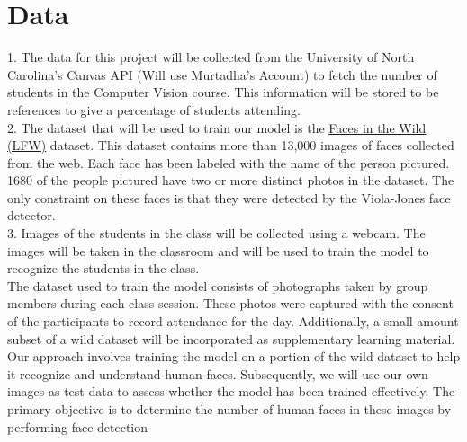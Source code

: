 \section{Data}
1. The data for this project will be collected from the University of North Carolina's Canvas API (Will use Murtadha's Account) to fetch the number of students in the Computer Vision course. This information will be stored to be references to give a percentage of students attending.\\
2. The dataset that will be used to train our model is the \href{http://vis-www.cs.umass.edu/lfw/}{\underline{Faces in the Wild (LFW)}} dataset. This dataset contains more than 13,000 images of faces collected from the web. Each face has been labeled with the name of the person pictured. 1680 of the people pictured have two or more distinct photos in the dataset. The only constraint on these faces is that they were detected by the Viola{-}Jones face detector.\\
3. Images of the students in the class will be collected using a webcam. The images will be taken in the classroom and will be used to train the model to recognize the students in the class.\\
The dataset used to train the model consists of photographs taken by group members during each class session. These photos were captured with the consent of the participants to record attendance for the day. Additionally, a small amount subset of a wild dataset will be incorporated as supplementary learning material.\\
Our approach involves training the model on a portion of the wild dataset to help it recognize and understand human faces. Subsequently, we will use our own images as test data to assess whether the model has been trained effectively. The primary objective is to determine the number of human faces in these images by performing face detection

